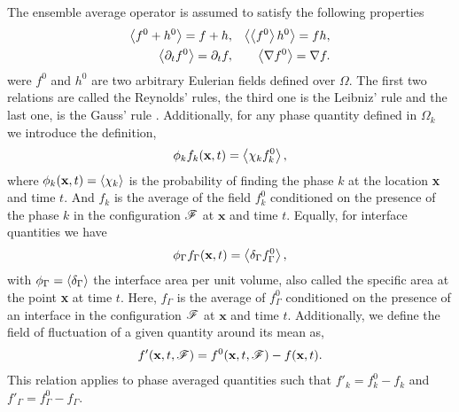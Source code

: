 The ensemble average operator is assumed to satisfy the following properties \citep{drew1983mathematical}
\begin{align}
    \avg{f^0+h^0} = f+h, 
    && \avg{\avg{f^0}h^0} = fh, \nonumber\\
    \avg{\pddt f^0} 
    = \pddt f,  
    &&\avg{\grad f^0}
    = \grad f. 
    \label{eq:avg_properties}
\end{align}
were $f^0$ and $h^0$ are two arbitrary Eulerian fields defined over $\Omega$. 
The first two relations are called the Reynolds' rules, the third one is the Leibniz' rule and the last one, is the Gauss' rule \citep{drew1983mathematical}.
Additionally, for any phase quantity defined in $\Omega_k$ we introduce the definition, 
\begin{equation}
    \phi_k f_k (\textbf{x},t) = \avg{\chi_k f_k^0},
    \label{eq:1_avg}
\end{equation}
where $\phi_k(\textbf{x},t) = \left<\chi_k\right>$ is the probability of finding the phase $k$ at the location \textbf{x} and time $t$.
And $f_k$ is the average of the field $f_k^0$ conditioned on the presence of the phase $k$ in the configuration $\mathscr{F}$ at $\textbf{x}$ and time $t$.
Equally, for interface quantities we have 
\begin{equation}
    \phi_\Gamma f_\Gamma (\textbf{x},t) = \left<\delta_\Gamma f_\Gamma^0\right>,
\end{equation}
with $\phi_\Gamma = \left<\delta_\Gamma\right>$ the interface area per unit volume, also called the specific area at the point \textbf{x} at time $t$. 
Here, $f_\Gamma$ is the average of $f^0_\Gamma$ conditioned on the presence of an interface in the configuration $\mathscr{F}$ at $\textbf{x}$ and time $t$. 
Additionally, we define the field of fluctuation of a given quantity around its mean as,
\begin{align}
    f'(\textbf{x},t,\FF) = f^0(\textbf{x},t,\FF) - f(\textbf{x},t).
    \label{eq:def_fluctu}
\end{align}
This relation applies to phase averaged quantities such that $f'_k = f^0_k - f_k$ and $f'_\Gamma = f^0_\Gamma - f_\Gamma$. 


